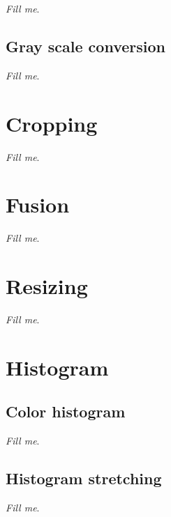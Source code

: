 \documentclass{report}
\begin{document}
		\textit{Fill me}.

	\subsection{Gray scale conversion}

		\textit{Fill me}.

\section{Cropping}

	\textit{Fill me}.

\section{Fusion}

	\textit{Fill me}.

\section{Resizing}

	\textit{Fill me}.

\section{Histogram}

	\subsection{Color histogram}

		\textit{Fill me}.

	\subsection{Histogram stretching}

		\textit{Fill me}.
\end{document}
